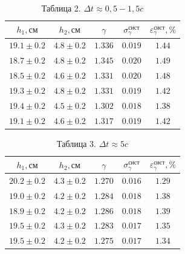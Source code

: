 \documentclass[a4paper]{article}
\begin{document}
\begin{enumerate}
\begin{table}[h!]
    \centering
    \begin{tabular}{|c|c|c|c|c|}
        \hline
        $h_1, \text{см}$ & $h_2, \text{см}$ & $\gamma$ & $\sigma_\gamma^{\text{сист}}$ & $\varepsilon_\gamma^{\text{сист}}, \%$ \\
        \hline
        $19.1 \pm 0.2$ & $4.8 \pm 0.2$ & $1.336$ & $0.019$ & $1.44$ \\ \hline
        $18.7 \pm 0.2$ & $4.8 \pm 0.2$ & $1.345$ & $0.020$ & $1.49$ \\ \hline
        $18.5 \pm 0.2$ & $4.6 \pm 0.2$ & $1.331$ & $0.020$ & $1.48$ \\ \hline
        $19.3 \pm 0.2$ & $4.8 \pm 0.2$ & $1.331$ & $0.019$ & $1.42$ \\ \hline
        $19.4 \pm 0.2$ & $4.5 \pm 0.2$ & $1.302$ & $0.018$ & $1.38$ \\ \hline
        $19.1 \pm 0.2$ & $4.6 \pm 0.2$ & $1.317$ & $0.019$ & $1.42$ \\ \hline
    \end{tabular}
    \caption{Таблица 2. $\Delta t \approx 0,5-1,5c$}
\end{table}

\begin{table}[h!]
    \centering
    \begin{tabular}{|c|c|c|c|c|}
        \hline
        $h_1, \text{см}$ & $h_2, \text{см}$ & $\gamma$ & $\sigma_\gamma^{\text{сист}}$ & $\varepsilon_\gamma^{\text{сист}}, \%$ \\
        \hline
        $20.2 \pm 0.2$ & $4.3 \pm 0.2$ & $1.270$ & $0.016$ & $1.29$ \\ \hline
        $19.0 \pm 0.2$ & $4.2 \pm 0.2$ & $1.284$ & $0.018$ & $1.38$ \\ \hline
        $18.9 \pm 0.2$ & $4.2 \pm 0.2$ & $1.286$ & $0.018$ & $1.39$ \\ \hline
        $19.5 \pm 0.2$ & $4.3 \pm 0.2$ & $1.283$ & $0.017$ & $1.35$ \\ \hline
        $19.5 \pm 0.2$ & $4.2 \pm 0.2$ & $1.275$ & $0.017$ & $1.34$ \\ \hline
    \end{tabular}
    \caption{Таблица 3. $\Delta t \approx 5 c$}
\end{table}


\end{enumerate}
\end{document}
